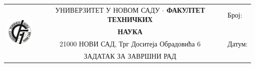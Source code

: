 \documentclass{article}
\begin{document}
\begin{center}
    \begin{tabular}{|c|c|p{1in}|}
    \hline
        \multirow{4}{*}{{\includegraphics[width=0.6in]{Images/FTN.png}}}
        & 
        УНИВЕРЗИТЕТ У НОВОМ САДУ  \textbf{ {\large$\cdot$} ФАКУЛТЕТ ТЕХНИЧКИХ} 
        & Број: \\
        \cline{3-3} & \textbf{НАУКА} & \ \\
        \cline{3-3} & 21000 НОВИ САД, Трг Доситеја Обрадовића 6 & Датум: \\
        \cline{2-3} & \cellcolor{gray!25}ЗАДАТАК ЗА ЗАВРШНИ РАД & \\
    \hline
    \end{tabular}
\end{center}
\end{document}

